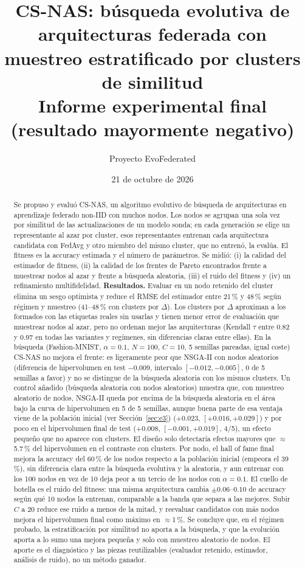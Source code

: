 \documentclass[11pt,a4paper]{article}
\title{CS-NAS: búsqueda evolutiva de arquitecturas federada con muestreo estratificado por clusters de similitud\\[2pt]\large Informe experimental final (resultado mayormente negativo)}
\author{Proyecto EvoFederated}
\date{21 de octubre de 2026}
\begin{document}
\maketitle

\begin{abstract}
\noindent Se propuso y evaluó CS-NAS, un algoritmo evolutivo de búsqueda de arquitecturas en aprendizaje federado non-IID con muchos nodos. Los nodos se agrupan una sola vez por similitud de las actualizaciones de un modelo sonda; en cada generación se elige un representante al azar por cluster, esos representantes entrenan cada arquitectura candidata con FedAvg y otro miembro del mismo cluster, que no entrenó, la evalúa. El fitness es la accuracy estimada y el número de parámetros. Se midió: (i) la calidad del estimador de fitness, (ii) la calidad de los frentes de Pareto encontrados frente a muestrear nodos al azar y frente a búsqueda aleatoria, (iii) el ruido del fitness y (iv) un refinamiento multifidelidad. \textbf{Resultados.} Evaluar en un nodo retenido del cluster elimina un sesgo optimista y reduce el RMSE del estimador entre 21\,\% y 48\,\% según régimen y muestreo (41--48\,\% con clusters por $\Delta$). Los clusters por $\Delta$ aproximan a los formados con las etiquetas reales sin usarlas y tienen menor error de evaluación que muestrear nodos al azar, pero no ordenan mejor las arquitecturas (Kendall $\tau$ entre 0.82 y 0.97 en todas las variantes y regímenes, sin diferencias claras entre ellas). En la búsqueda (Fashion-MNIST, $\alpha=0.1$, $N=100$, $C=10$, 5 semillas pareadas, igual coste) CS-NAS no mejora el frente: es ligeramente peor que NSGA-II con nodos aleatorios (diferencia de hipervolumen en test $-0.009$, intervalo $[-0.012,-0.005]$, 0 de 5 semillas a favor) y no se distingue de la búsqueda aleatoria con los mismos clusters. Un control añadido (búsqueda aleatoria con nodos aleatorios) muestra que, con muestreo aleatorio de nodos, NSGA-II queda por encima de la búsqueda aleatoria en el área bajo la curva de hipervolumen en 5 de 5 semillas, aunque buena parte de esa ventaja viene de la población inicial (ver Sección~\ref{sec:e3}) ($+0.023$, $[+0.016,+0.029]$) y por poco en el hipervolumen final de test ($+0.008$, $[-0.001,+0.019]$, 4/5), un efecto pequeño que no aparece con clusters. El diseño solo detectaría efectos mayores que $\approx$5.7\,\% del hipervolumen en el contraste con clusters. Por nodo, el hall of fame final mejora la accuracy del 60\,\% de los nodos respecto a la población inicial (empeora el 39\,\%), sin diferencia clara entre la búsqueda evolutiva y la aleatoria, y aun entrenar con los 100 nodos en vez de 10 deja peor a un tercio de los nodos con $\alpha=0.1$. El cuello de botella es el ruido del fitness: una misma arquitectura cambia $\pm0.06$--$0.10$ de accuracy según qué 10 nodos la entrenan, comparable a la banda que separa a las mejores. Subir $C$ a 20 reduce ese ruido a menos de la mitad, y reevaluar candidatos con más nodos mejora el hipervolumen final como máximo en $\approx$1\,\%. Se concluye que, en el régimen probado, la estratificación por similitud no aporta a la búsqueda, y que la evolución aporta a lo sumo una mejora pequeña y solo con muestreo aleatorio de nodos. El aporte es el diagnóstico y las piezas reutilizables (evaluador retenido, estimador, análisis de ruido), no un método ganador.

\end{abstract}
\end{document}
